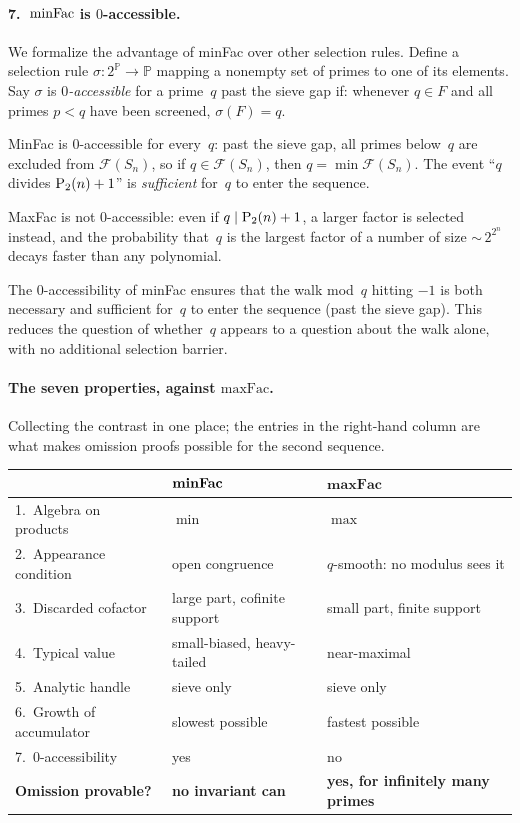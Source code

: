 \paragraph{7.\ $\mathrm{minFac}$ is $0$-accessible.}
We formalize the advantage of minFac over other selection rules.  Define
a selection rule $\sigma\colon 2^{\mathbb{P}} \to \mathbb{P}$ mapping a
nonempty set of primes to one of its elements.  Say $\sigma$ is
\emph{$0$-accessible} for a prime~$q$ past the sieve gap if: whenever
$q \in F$ and all primes $p < q$ have been screened, $\sigma(F) = q$.

MinFac is $0$-accessible for every~$q$: past the sieve gap, all primes
below~$q$ are excluded from $\mathcal{F}(S_n)$, so if
$q \in \mathcal{F}(S_n)$, then $q = \min \mathcal{F}(S_n)$.  The event
``$q$ divides $\mathrm{P}_{2}(n)+1$'' is \emph{sufficient} for~$q$ to enter the
sequence.

MaxFac is not $0$-accessible: even if $q \mid \mathrm{P}_{2}(n)+1$, a larger
factor is selected instead, and the probability that~$q$ is the largest
factor of a number of size ${\sim}\, 2^{2^n}$ decays faster than any
polynomial.

The $0$-accessibility of minFac ensures that the walk mod~$q$ hitting
$-1$ is both necessary and sufficient for~$q$ to enter the sequence
(past the sieve gap).  This reduces the question of whether~$q$ appears
to a question about the walk alone, with no additional selection barrier.

\paragraph{The seven properties, against $\mathrm{maxFac}$.}
Collecting the contrast in one place; the entries in the right-hand
column are what makes omission proofs possible for the second sequence.

\smallskip
\begin{center}
\begin{tabular}{@{}l@{\quad}l@{\quad}l@{}}
\toprule
 & $\boldsymbol{\mathrm{minFac}}$ & $\mathbf{maxFac}$ \\
\midrule
1.\ Algebra on products
  & $\min$ & $\max$ \\
2.\ Appearance condition
  & open congruence & $q$-smooth: no modulus sees it \\
3.\ Discarded cofactor
  & large part, cofinite support & small part, finite support \\
4.\ Typical value
  & small-biased, heavy-tailed & near-maximal \\
5.\ Analytic handle
  & sieve only & sieve only \\
6.\ Growth of accumulator
  & slowest possible & fastest possible \\
7.\ $0$-accessibility
  & yes & no \\
\midrule
\textbf{Omission provable?}
  & \textbf{no invariant can} & \textbf{yes, for infinitely many primes} \\
\bottomrule
\end{tabular}
\end{center}

